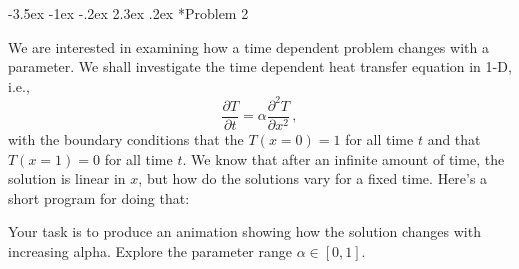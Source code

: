 \documentclass[11pt]{article}
\makeatletter
\renewcommand\section{\@startsection{section}{1}{\z@}%
                                  {-3.5ex \@plus -1ex \@minus -.2ex}%
                                  {2.3ex \@plus.2ex}%
                                  {\normalfont\bfseries}}
\makeatother
\begin{document}
\section*{Problem 2}

We are interested in examining how a time dependent problem changes with a parameter.  We shall investigate the time dependent heat transfer equation in 1-D, i.e.,
\begin{equation}
    \frac{\partial T}{\partial t} = \alpha \frac{\partial^2 T}{\partial x^2}\, ,
\end{equation}
with the boundary conditions that the $T(x=0)=1$ for all time $t$ and that $T(x=1) = 0$ for all time $t$.  We know that after an infinite amount of time, the solution is linear in $x$, but how do the solutions vary for a fixed time.  Here's a short program for doing that:





Your task is to produce an animation showing how the solution changes with increasing alpha.  Explore the parameter range $\alpha\in[0,1]$. \\
 
\end{document}
